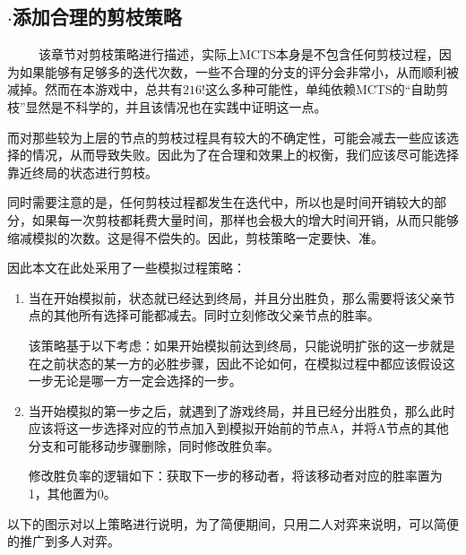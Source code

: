 \documentclass[9pt,twocolumn,twoside]{osajnl}
\begin{document}
\subsection{$\cdot$添加合理的剪枝策略}
\begin{adjustwidth}{2em}{}	
	\ \ \ \ \
	该章节对剪枝策略进行描述，实际上MCTS本身是不包含任何剪枝过程，因为如果能够有足够多的迭代次数，一些不合理的分支的评分会非常小，从而顺利被减掉。然而在本游戏中，总共有$216!$这么多种可能性，单纯依赖MCTS的“自助剪枝”显然是不科学的，并且该情况也在实践中证明这一点。

	而对那些较为上层的节点的剪枝过程具有较大的不确定性，可能会减去一些应该选择的情况，从而导致失败。因此为了在合理和效果上的权衡，我们应该尽可能选择靠近终局的状态进行剪枝。
	
	同时需要注意的是，任何剪枝过程都发生在迭代中，所以也是时间开销较大的部分，如果每一次剪枝都耗费大量时间，那样也会极大的增大时间开销，从而只能够缩减模拟的次数。这是得不偿失的。因此，剪枝策略一定要快、准。
	
	因此本文在此处采用了一些模拟过程策略：
	\begin{enumerate}
		\item 当在开始模拟前，状态就已经达到终局，并且分出胜负，那么需要将该父亲节点的其他所有选择可能都减去。同时立刻修改父亲节点的胜率。
		
		该策略基于以下考虑：如果开始模拟前达到终局，只能说明扩张的这一步就是在之前状态的某一方的必胜步骤，因此不论如何，在模拟过程中都应该假设这一步无论是哪一方一定会选择的一步。
		
		\item 当开始模拟的第一步之后，就遇到了游戏终局，并且已经分出胜负，那么此时应该将这一步选择对应的节点加入到模拟开始前的节点A，并将A节点的其他分支和可能移动步骤删除，同时修改胜负率。
		
		修改胜负率的逻辑如下：获取下一步的移动者，将该移动者对应的胜率置为1，其他置为0。
	\end{enumerate}
	
	以下的图示对以上策略进行说明，为了简便期间，只用二人对弈来说明，可以简便的推广到多人对弈。
	

\end{adjustwidth}
\end{document}
